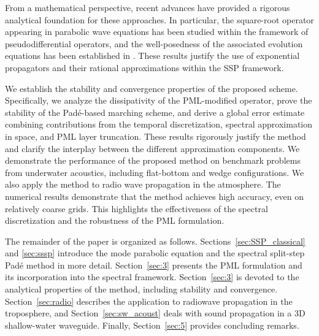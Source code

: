 \documentclass[11pt,a4paper]{article}
\theoremstyle{plain}%
\theoremstyle{definition}
\theoremstyle{remark}
\begin{document}
From a mathematical perspective, recent advances have provided a rigorous analytical foundation for these approaches. 
In particular, the square-root operator appearing in parabolic wave equations has been studied within the framework of pseudodifferential operators, and the well-posedness of the associated evolution equations has been established in \cite{ehrhardt2025square}. 
These results justify the use of exponential propagators and their rational approximations within the SSP framework.

We establish the stability and convergence properties of the proposed scheme. 
Specifically, we analyze the dissipativity of the PML-modified operator, prove the stability of the Pad\'e-based marching scheme, and derive a global error estimate combining contributions from the temporal discretization, spectral approximation in space, and PML layer truncation.
These results rigorously justify the method and clarify the interplay between the different approximation components.
%
We demonstrate the performance of the proposed method on benchmark problems from underwater acoustics, 
including flat-bottom and wedge configurations. 
We also apply the method to radio wave propagation in the atmosphere. 
The numerical results demonstrate that the method achieves high accuracy, even on relatively coarse grids.
This highlights the effectiveness of the spectral discretization and the robustness of the PML formulation.

The remainder of the paper is organized as follows. 
Sections~\ref{sec:SSP_classical} and \ref{sec:sssp} introduce the mode parabolic equation and the spectral split-step Pad\'e method in more detail. 
Section~\ref{sec:3} presents the PML formulation and its incorporation into the spectral framework. 
Section~\ref{sec:3} is devoted to the analytical properties of the method, including stability and convergence. 
Section~\ref{sec:radio} describes the application to radiowave propagation in the troposphere,
and Section~\ref{sec:sw_acoust} deals with sound propagation in a 3D shallow-water waveguide.
Finally, Section~\ref{sec:5} provides concluding remarks.




\end{document}
